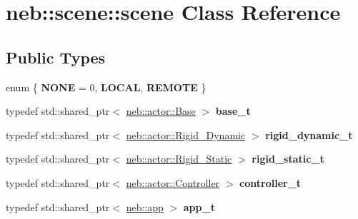 \hypertarget{classneb_1_1scene_1_1scene}{
\section{neb::scene::scene Class Reference}
\label{classneb_1_1scene_1_1scene}
}
\subsection*{Public Types}
\begin{DoxyCompactItemize}
\item 
enum \{ {\bfseries NONE} =  0, 
{\bfseries LOCAL}, 
{\bfseries REMOTE}
 \}
\item 
\hypertarget{classneb_1_1scene_1_1scene_a12a166d302ebe2c0ccc39c97d8dcd58b}{
typedef std::shared\_\-ptr$<$ \hyperlink{classneb_1_1actor_1_1Base}{neb::actor::Base} $>$ {\bfseries base\_\-t}}
\label{classneb_1_1scene_1_1scene_a12a166d302ebe2c0ccc39c97d8dcd58b}

\item 
\hypertarget{classneb_1_1scene_1_1scene_a102a6dc3de38eda425650b9122676a78}{
typedef std::shared\_\-ptr$<$ \hyperlink{classneb_1_1actor_1_1Rigid__Dynamic}{neb::actor::Rigid\_\-Dynamic} $>$ {\bfseries rigid\_\-dynamic\_\-t}}
\label{classneb_1_1scene_1_1scene_a102a6dc3de38eda425650b9122676a78}

\item 
\hypertarget{classneb_1_1scene_1_1scene_a782cb687dc9d61c8fcd5b12aa4189487}{
typedef std::shared\_\-ptr$<$ \hyperlink{classneb_1_1actor_1_1Rigid__Static}{neb::actor::Rigid\_\-Static} $>$ {\bfseries rigid\_\-static\_\-t}}
\label{classneb_1_1scene_1_1scene_a782cb687dc9d61c8fcd5b12aa4189487}

\item 
\hypertarget{classneb_1_1scene_1_1scene_a4d26816606556e2642a49ba31d10e6e3}{
typedef std::shared\_\-ptr$<$ \hyperlink{classneb_1_1actor_1_1Controller}{neb::actor::Controller} $>$ {\bfseries controller\_\-t}}
\label{classneb_1_1scene_1_1scene_a4d26816606556e2642a49ba31d10e6e3}

\item 
\hypertarget{classneb_1_1scene_1_1scene_a91d267e955478e0ae15693eb49103e3c}{
typedef std::shared\_\-ptr$<$ \hyperlink{classneb_1_1app}{neb::app} $>$ {\bfseries app\_\-t}}
\label{classneb_1_1scene_1_1scene_a91d267e955478e0ae15693eb49103e3c}

\end{DoxyCompactItemize}
